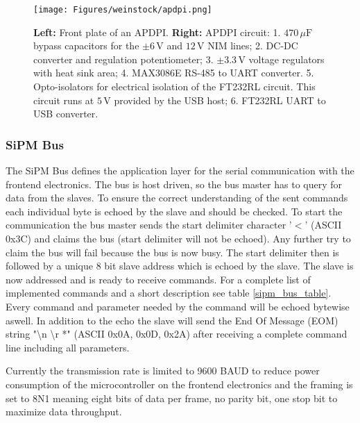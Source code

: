 \documentclass[]{article}
\begin{document}
	\begin{figure}[]
		\centering
			\texttt{[image: Figures/weinstock/apdpi.png]}
		\caption{\textbf{Left:} Front plate of an APDPI. \textbf{Right:} APDPI circuit: 1. $470\,\mu \text{F}$ bypass capacitors for the $\pm6\,\text{V}$ and $12\,\text{V}$ 
												   NIM lines;
												2. DC-DC converter and regulation potentiometer;
												3. $\pm3.3\,\text{V}$ voltage regulators with heat sink area;
												4. MAX3086E RS-485 to UART converter.
												5. Opto-isolators for electrical isolation of the FT232RL circuit. This circuit runs
												at $5\,\text{V}$ provided by the USB host;
												6. FT232RL UART to USB converter.}
		\label{APDPI_front}
	\end{figure}	

\subsubsection{SiPM Bus}

The SiPM Bus defines the application layer for the serial communication with the frontend electronics. The bus is host driven, so the bus master has to query for data from the slaves.
To ensure the correct understanding of the sent commands each individual byte is echoed by the slave and should be checked. To start the communication the bus master sends the start
delimiter character '$<$' (ASCII 0x3C) and claims the bus (start delimiter will not be echoed). Any further try to claim the bus will fail because the bus is now busy. 
The start delimiter then is followed by a unique 8 bit slave address which is echoed by the slave. The slave is now addressed and is ready to receive commands. For a complete list of
implemented commands and a short description see table \ref{sipm_bus_table}. Every command and parameter needed by the command will be echoed bytewise aswell. In addition to the echo 
the slave will send the End Of Message (EOM) string "\textbackslash n \textbackslash r *" (ASCII 0x0A, 0x0D, 0x2A) after receiving a complete command line including all parameters.

Currently the transmission rate is limited to 9600 BAUD to reduce power consumption of the microcontroller on the frontend electronics and the framing is set to 8N1 meaning eight 
bits of data per frame, no parity bit, one stop bit to maximize data throughput.
\end{document}
